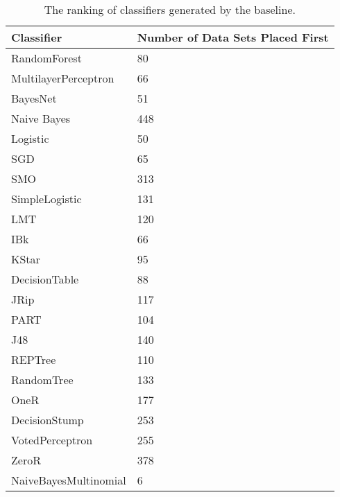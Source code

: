 \begin{table}[h]
\centering
	\begin{tabularx}{\textwidth}{X | X}
		Classifier				&	Number of Data Sets Placed First \\	\hline
		RandomForest				&	80								\\	\hline
		MultilayerPerceptron		&	66								\\	\hline
		BayesNet					&	51								\\	\hline
		Naive Bayes				&	448								\\	\hline	
		Logistic					&	50								\\	\hline	
		SGD						&	65								\\	\hline
		SMO						&	313								\\	\hline
		SimpleLogistic			&	131								\\	\hline
		LMT						&	120								\\	\hline	
		IBk						&	66								\\	\hline	
		KStar					&	95								\\	\hline	
		DecisionTable			&	88								\\	\hline
		JRip						&	117								\\	\hline
		PART						&	104								\\	\hline
		J48						&	140								\\	\hline	
		REPTree					&	110								\\	\hline
		RandomTree				&	133								\\	\hline	
		OneR						&	177								\\	\hline						
		DecisionStump			&	253								\\	\hline
		VotedPerceptron			&	255								\\	\hline	
		ZeroR					&	378								\\	\hline	
		NaiveBayesMultinomial	&	6								\\	\hline	
	\end{tabularx}
	\caption{The ranking of classifiers generated by the baseline.}
	\label{tab:bestAlgorithmRanking}
\end{table}